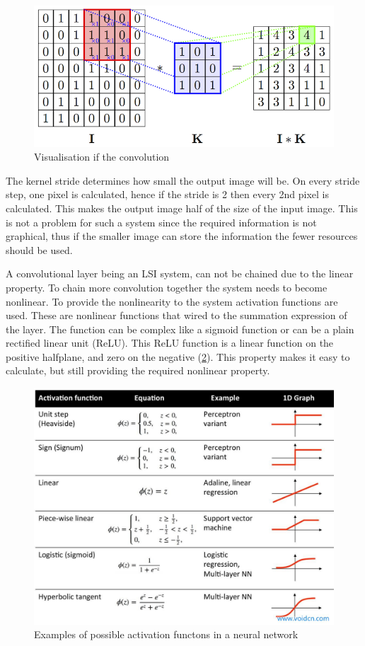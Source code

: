\begin{figure}
\centering
\includegraphics[width=\linewidth]{images/convolve.png}
\caption{Visualisation if the convolution \cite{spark_deep_nodate}}
\label{fig:convolvution}
\end{figure}

The kernel stride determines how small the output image will be.
On every stride step, one pixel is calculated, hence if the stride is 2 then every 2nd pixel is calculated.
This makes the output image half of the size of the input image.
This is not a problem for such a system since the required information is not graphical, thus if the smaller image can store the information the fewer resources should be used.

A convolutional layer being an LSI system, can not be chained due to the linear property.
To chain more convolution together the system needs to become nonlinear.
To provide the nonlinearity to the system activation functions are used.
These are nonlinear functions that wired to the summation expression of the layer.
The function can be complex like a sigmoid function or can be a plain rectified linear unit (ReLU).
This ReLU function is a linear function on the positive halfplane, and zero on the negative (\cref{fig:relufunc}).
This property makes it easy to calculate, but still providing the required nonlinear property.

\begin{figure}
\centering
\includegraphics[width=.85\linewidth]{images/activation-functions.jpg}
\caption{Examples of possible activation functons in a neural network \cite{sebastian_activation} }
\label{fig:relufunc}
\end{figure}

